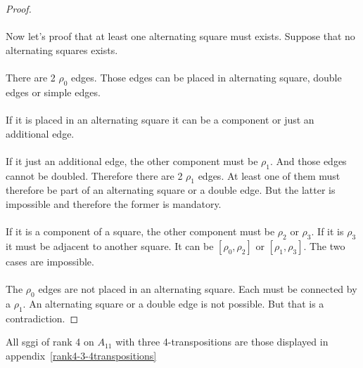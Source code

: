 \begin{proof}
  \paragraph{}
  Now let's proof that at least one alternating square must exists. Suppose that no alternating squares exists.

  \paragraph{}
  There are 2 $\rho_0$ edges. Those edges can be placed in alternating square, double edges or simple edges.

  \paragraph{}
  If it is placed in an alternating square it can be a component or just an additional edge.

  \paragraph{}
  If it just an additional edge, the other component must be $\rho_1$. And those edges cannot be doubled. Therefore there are 2 $\rho_1$ edges. At least one of them must therefore be part of an alternating square or a double edge. But the latter is impossible and therefore the former is mandatory.

  \paragraph{}
  If it is a component of a square, the other component must be $\rho_2$ or $\rho_3$. If it is $\rho_3$ it must be  adjacent to another square. It can be $[\rho_0, \rho_2]$ or $[\rho_1, \rho_3]$. The two cases are impossible.

  \paragraph{}
  The $\rho_0$ edges are not placed in an alternating square. Each must be connected by a $\rho_1$. An alternating square or a double edge is not possible. But that is a contradiction.
\end{proof}

\begin{theorem}
  All sggi of rank 4 on $A_{11}$ with three 4-transpositions are those displayed in appendix~\ref{rank4-3-4transpositions}
\end{theorem}


